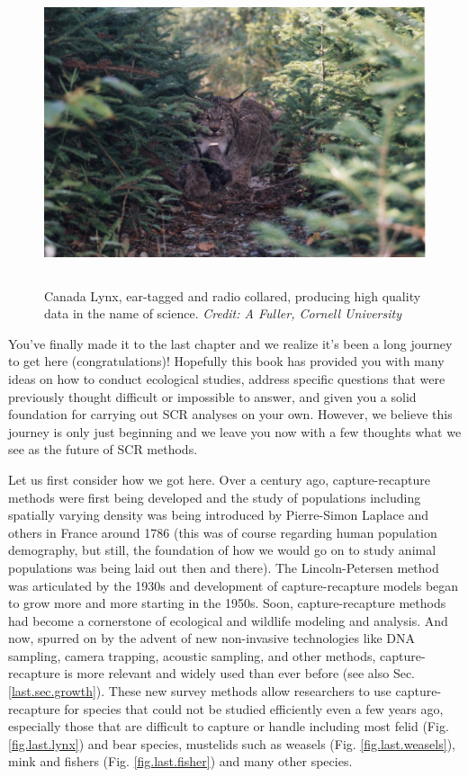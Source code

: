 \begin{figure}[h!]
\centering
\includegraphics[height=3.5in]{Ch20-Last/lynx.jpg}
\caption{
Canada Lynx, ear-tagged and radio collared, producing high quality
data in the name of science.
{\it Credit: A Fuller, Cornell University} }
\label{last.fig.lynx}
\end{figure}

You've finally made it to the last chapter and we realize it's been a long journey to 
get here (congratulations)! Hopefully this book has provided you with many ideas on how 
to conduct ecological studies, address specific questions that were previously
thought difficult or impossible
to answer, and given you a solid foundation for carrying out SCR analyses 
on your own. However, we believe this journey is only just beginning and we leave you
now with a few thoughts what we see as the future of SCR methods. 

Let us first consider how we got here. Over a century ago, capture-recapture
methods were first being developed and the study of populations including
spatially varying density was being introduced by Pierre-Simon Laplace and others in France around
1786 (this was of course regarding human population demography, but still, the foundation of how 
we would go on to study animal populations was being laid out then and there). 
The Lincoln-Petersen method was articulated by
 the 1930s and development of
capture-recapture models began to grow more and more starting in the 1950s. 
Soon, capture-recapture methods had become a cornerstone of ecological and wildlife
modeling and analysis. And now, spurred on by the advent of 
new non-invasive technologies like DNA
sampling, camera trapping, acoustic sampling, and other methods,
capture-recapture is more relevant and widely used than ever before
(see also Sec. \ref{last.sec.growth}). These new survey methods allow
researchers to use capture-recapture for species that could not be
studied efficiently even a few years ago, especially those that are
difficult to capture or handle including most felid
(Fig. \ref{fig.last.lynx})
and bear
species, mustelids such as weasels (Fig. \ref{fig.last.weasels}), 
mink and fishers (Fig. \ref{fig.last.fisher}) and many other species. 

